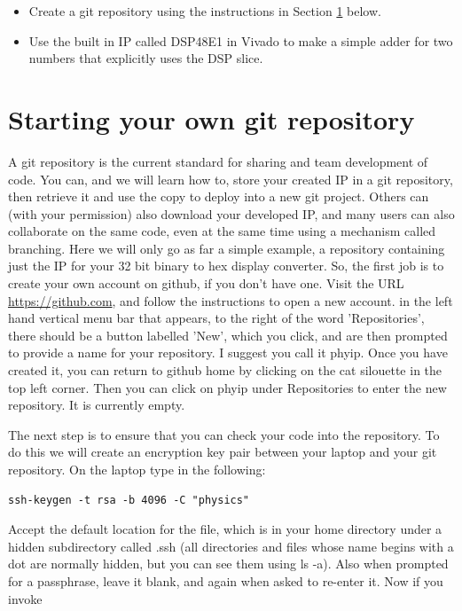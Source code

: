 \documentclass[../physical_computing.tex]{subfiles}
\begin{document}
\begin{itemize}
    \item Create a git repository using the instructions in Section \ref{sec:gitrepo} below.
    \item Use the built in IP called DSP48E1 in Vivado to make a simple adder for two numbers that explicitly uses the DSP slice.
\end{itemize}

\section{Starting your own git repository}
\label{sec:gitrepo}

A git repository is the current standard for sharing and team development of code. You can, and we will learn how to, store your created IP in a git repository, then retrieve it and use the copy to deploy into a new git project. Others can (with your permission) also download your developed IP, and many users can also collaborate on the same code, even at the same time using a mechanism called branching. Here we will only go as far a simple example, a repository containing just the IP for your 32 bit binary to hex display converter. So, the first job is to create your own account on github, if you don't have one. Visit the URL \url{https://github.com}, and follow the instructions to open a new account. in the left hand vertical menu bar that appears, to the right of the word 'Repositories', there should be a button labelled 'New', which you click, and are then prompted to provide a name for your repository. I suggest you call it phyip. Once you have created it, you can return to github home by clicking on the cat silouette in the top left corner. Then you can click on phyip under Repositories to enter the new repository. It is currently empty. 

The next step is to ensure that you can check your code into the repository. To do this we will create an encryption key pair between your laptop and your git repository. On the laptop type in the following:

\begin{verbatim}
ssh-keygen -t rsa -b 4096 -C "physics"
\end{verbatim}

Accept the default location for the file, which is in your home directory under a hidden subdirectory called .ssh (all directories and files whose name begins with a dot are normally hidden, but you can see them using ls -a). Also when prompted for a passphrase, leave it blank, and again when asked to re-enter it. Now if you invoke
\end{document}
